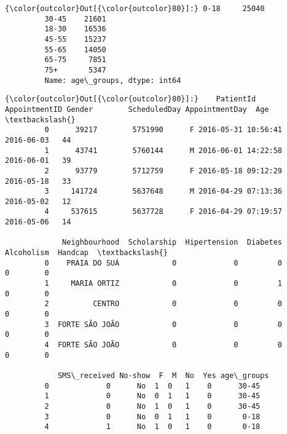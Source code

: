 \documentclass[11pt]{article}
\begin{document}
\begin{Verbatim}[commandchars=\\\{\}]
{\color{outcolor}Out[{\color{outcolor}80}]:} 0-18     25040
         30-45    21601
         18-30    16536
         45-55    15237
         55-65    14050
         65-75     7851
         75+       5347
         Name: age\_groups, dtype: int64
\end{Verbatim}
            
\begin{Verbatim}[commandchars=\\\{\}]
{\color{outcolor}Out[{\color{outcolor}80}]:}    PatientId  AppointmentID Gender        ScheduledDay AppointmentDay  Age  \textbackslash{}
         0      39217        5751990      F 2016-05-31 10:56:41     2016-06-03   44   
         1      43741        5760144      M 2016-06-01 14:22:58     2016-06-01   39   
         2      93779        5712759      F 2016-05-18 09:12:29     2016-05-18   33   
         3     141724        5637648      M 2016-04-29 07:13:36     2016-05-02   12   
         4     537615        5637728      F 2016-04-29 07:19:57     2016-05-06   14   
         
             Neighbourhood  Scholarship  Hipertension  Diabetes  Alcoholism  Handcap  \textbackslash{}
         0    PRAIA DO SUÁ            0             0         0           0        0   
         1     MARIA ORTIZ            0             0         1           0        0   
         2          CENTRO            0             0         0           0        0   
         3  FORTE SÃO JOÃO            0             0         0           0        0   
         4  FORTE SÃO JOÃO            0             0         0           0        0   
         
            SMS\_received No-show  F  M  No  Yes age\_groups  
         0             0      No  1  0   1    0      30-45  
         1             0      No  0  1   1    0      30-45  
         2             0      No  1  0   1    0      30-45  
         3             0      No  0  1   1    0       0-18  
         4             1      No  1  0   1    0       0-18  
\end{Verbatim}
            
\end{document}
